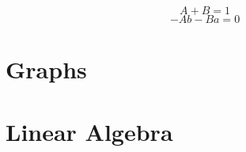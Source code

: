 \documentclass[twoside]{article}
\def\beginrefs{\begin{list}%
        {[\arabic{equation}]}{\usecounter{equation}
         \setlength{\leftmargin}{2.0truecm}\setlength{\labelsep}{0.4truecm}%
         \setlength{\labelwidth}{1.6truecm}}}
\def\endrefs{\end{list}}
\def\bibentry#1{\item[\hbox{[#1]}]}
\begin{document}
\begin{equation}
A + B = 1
\end{equation}
\begin{equation}
-Ab - Ba = 0
\end{equation}
\section{Graphs}
\section{Linear Algebra}
\end{document}
